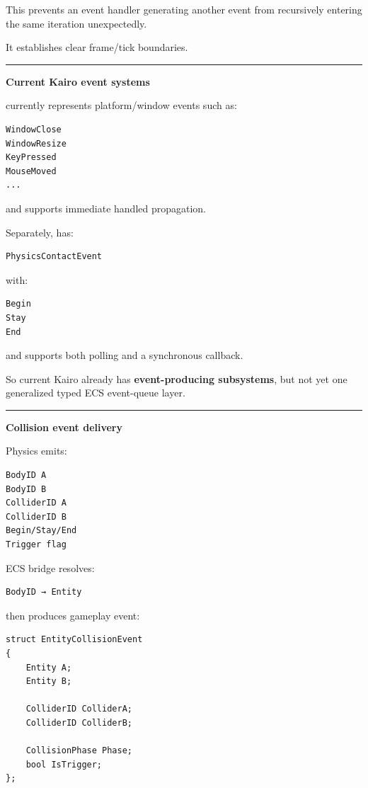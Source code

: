 This prevents an event handler generating another event from recursively entering the same iteration unexpectedly.

It establishes clear frame/tick boundaries.

\begin{center}\rule{0.5\linewidth}{0.5pt}\end{center}

\textbf{Current Kairo event systems}

 currently represents platform/window events such as:

\begin{verbatim}
WindowClose
WindowResize
KeyPressed
MouseMoved
...
\end{verbatim}

and supports immediate handled propagation.

Separately,  has:

\begin{verbatim}
PhysicsContactEvent
\end{verbatim}

with:

\begin{verbatim}
Begin
Stay
End
\end{verbatim}

and supports both polling and a synchronous callback.

So current Kairo already has \textbf{event-producing subsystems}, but not yet one generalized typed ECS event-queue layer.

\begin{center}\rule{0.5\linewidth}{0.5pt}\end{center}

\textbf{Collision event delivery}

Physics emits:

\begin{verbatim}
BodyID A
BodyID B
ColliderID A
ColliderID B
Begin/Stay/End
Trigger flag
\end{verbatim}

ECS bridge resolves:

\begin{verbatim}
BodyID → Entity
\end{verbatim}

then produces gameplay event:

\begin{verbatim}
struct EntityCollisionEvent
{
    Entity A;
    Entity B;

    ColliderID ColliderA;
    ColliderID ColliderB;

    CollisionPhase Phase;
    bool IsTrigger;
};
\end{verbatim}

